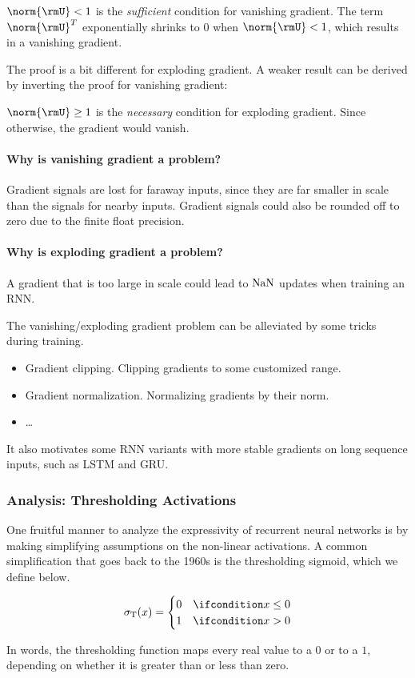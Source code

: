 $\norm{\rmU} < 1$ is the \emph{sufficient} condition for vanishing gradient. The term $\norm{\rmU}^T$ exponentially shrinks to $0$ when $\norm{\rmU} < 1$, which results in a vanishing gradient. 


The proof is a bit different for exploding gradient. A weaker result can be derived by inverting the proof for vanishing gradient:

$\norm{\rmU} \geq 1$ is the \emph{necessary} condition for exploding gradient. Since otherwise, the gradient would vanish. 


\paragraph{Why is vanishing gradient a problem?} 
Gradient signals are lost for faraway inputs, since they are far smaller in scale than the signals for nearby inputs. 
Gradient signals could also be rounded off to zero due to the finite float precision. 

\paragraph{Why is exploding gradient a problem?} 
A gradient that is too large in scale could lead to $\textnormal{NaN}$ updates when training an RNN. 


The vanishing/exploding gradient problem can be alleviated by some tricks during training. 
\begin{itemize}
    \item Gradient clipping. Clipping gradients to some customized range. 
    \item Gradient normalization. Normalizing gradients by their norm.
    \item \ldots
\end{itemize}


It also motivates some RNN variants with more stable gradients on long sequence inputs, such as LSTM and GRU. 


\subsubsection{Analysis: Thresholding Activations}
One fruitful manner to analyze the expressivity of recurrent neural networks is by making simplifying assumptions on the non-linear activations.
A common simplification that goes back to the 1960s is the thresholding sigmoid, which we define below.
\begin{definition}
$$
    \sigma_{\textnormal{T}}(x)=
    \begin{cases}
    0 &  \ifcondition x  \le 0 \\
    1 &  \ifcondition x  > 0
    \end{cases}
$$
\end{definition}
In words, the thresholding function maps every real value to a $0$ or to a $1$, depending on whether it is greater than or less than zero. 

